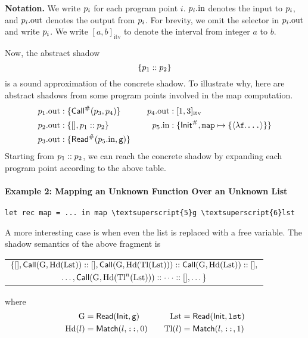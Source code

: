\documentclass{article}
\begin{document}
\vspace{\topsep}
\noindent\textbf{Notation.}
We write $p_i$ for each program point $i$.
$p_i.\text{in}$ denotes the input to $p_i$, and $p_i.\text{out}$
denotes the output from $p_i$.
For brevity, we omit the selector in $p_i.\text{out}$ and write $p_i$.
We write $[a,b]_{\text{itv}}$ to denote the interval from integer $a$ to $b$.

\vspace{\topsep}
Now, the abstract shadow
\[\{p_1:: p_2\}\]
is a sound approximation of the concrete shadow. To illustrate why,
here are abstract shadows from some program points involved in the map computation.
\begin{align*}
  p_1.\text{out}:\{ & {\mathsf{Call}}^{\#}(p_3,p_4)\}            &  &  & p_4.\text{out}: & \;[1,3]_{\text{itv}}                                                                 \\
  p_2.\text{out}:\{ & [],p_1:: p_2\}                &  &  & p_5.\text{in}:  & \;\{{\mathsf{Init}}^{\#},\texttt{map}\mapsto\{\langle\lambda\texttt{f}.\texttt{...}\rangle\}\} \\
  p_3.\text{out}:\{ & {\mathsf{Read}}^{\#}(p_5.\text{in},\texttt{g})\}
\end{align*}
Starting from $p_1::p_2$, we can reach the concrete shadow by
expanding each program point according to the above table.

\paragraph{Example 2: Mapping an Unknown Function Over an Unknown List}
\begin{center}
  \begin{BVerbatim}[commandchars=\\\{\}]
let rec map = ... in map \textsuperscript{5}g \textsuperscript{6}lst
  \end{BVerbatim}
\end{center}
A more interesting case is when even the list is replaced with a free variable.
The shadow semantics of the above fragment is
\begin{center}
  \begin{tabular}{c}
    $\{[],\mathsf{Call}(\text{G},\textnormal{Hd}(\text{Lst}))::[],\mathsf{Call}(\text{G},\textnormal{Hd}(\textnormal{Tl}(\text{Lst})))::\mathsf{Call}(\text{G},\textnormal{Hd}(\text{Lst}))::[],$ \\
    [4pt]
    $\dots,\mathsf{Call}(\text{G},\textnormal{Hd}(\textnormal{Tl}^{n}(\text{Lst})))::\cdots::[],\dots\}$
  \end{tabular}
\end{center}
where
\begin{align*}
  \text{G} & =\mathsf{Read}(\mathsf{Init},\texttt{g})       &  &  & \text{Lst} & =\mathsf{Read}(\mathsf{Init},\texttt{lst})     \\
  \textnormal{Hd}(l)   & =\textsf{Match}(l,\texttt{::},0) &  &  & \textnormal{Tl}(l)     & =\textsf{Match}(l,\texttt{::},1)
\end{align*}
\end{document}
